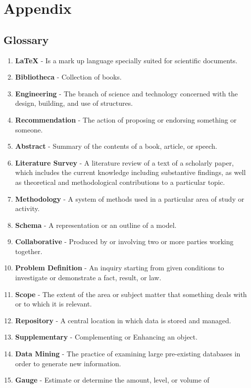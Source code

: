 \documentclass[a4paper,12pt]{report}
\begin{document}
\chapter{Appendix}
\section{Glossary}

\begin{enumerate}
  \item \textbf{LaTeX} - Is a mark up language specially suited for
scientific documents.
  \item \textbf{Bibliotheca} - Collection of books.
  \item \textbf{Engineering} - The branch of science and technology concerned with the design, building, and use of structures.
  \item \textbf{Recommendation} - The action of proposing or endorsing something or someone.
  \item \textbf{Abstract} - Summary of the contents of a book, article, or speech.
  \item \textbf{Literature Survey} - A literature review of a text of a scholarly paper, which includes the current knowledge including substantive findings, as well as theoretical and methodological contributions to a particular topic.
  \item \textbf{Methodology} - A system of methods used in a particular area of study or activity.
  \item \textbf{Schema} - A representation or an outline of a model.
  \item \textbf{Collaborative} - Produced by or involving two or more parties working together.
  \item \textbf{Problem Definition} - An inquiry starting from given conditions to investigate or demonstrate a fact, result, or law.
  \item \textbf{Scope} - The extent of the area or subject matter that something deals with or to which it is relevant.
  \item \textbf{Repository} - A central location in which data is stored and managed.
  \item \textbf{Supplementary} - Complementing or Enhancing an object.
  \item \textbf{Data Mining} - The practice of examining large pre-existing databases in order to generate new information.
  \item \textbf{Gauge} - Estimate or determine the amount, level, or volume of

\end{enumerate}
\end{document}
